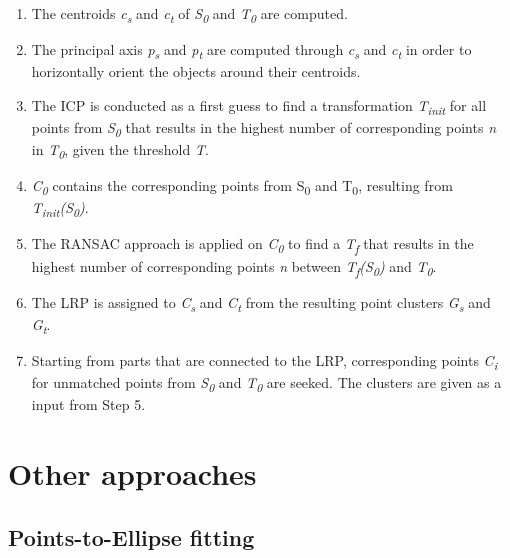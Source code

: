 \begin{enumerate}
	\item The centroids \textit{c\textsubscript{s}} and \textit{c\textsubscript{t}} of \textit{S\textsubscript{0}} and \textit{T\textsubscript{0}} are computed.
	
	\item The principal axis \textit{p\textsubscript{s}} and \textit{p\textsubscript{t}}  are computed through \textit{c\textsubscript{s}} and \textit{c\textsubscript{t}} in order to horizontally orient the objects around their centroids.
	
	\item The ICP is conducted as a first guess to find a transformation \textit{T\textsubscript{init}} for all points from \textit{S\textsubscript{0}} that results in the highest number of corresponding points \textit{n} in \textit{T\textsubscript{0}}, given the threshold \textit{T}.
	
	\item \textit{C\textsubscript{0}} contains the corresponding points from S\textsubscript{0} and T\textsubscript{0}, resulting from \textit{T\textsubscript{init}(S\textsubscript{0})}.
	
	\item The RANSAC approach is applied on \textit{C\textsubscript{0}} to find a  \textit{T\textsubscript{f}} that results in the highest number of corresponding points \textit{n} between \textit{T\textsubscript{f}(S\textsubscript{0})} and \textit{T\textsubscript{0}}.
	
	\item The LRP is assigned to \textit{C\textsubscript{s}} and \textit{C\textsubscript{t}} from the resulting point clusters \textit{G\textsubscript{s}} and \textit{G\textsubscript{t}}.
	
	\item Starting from parts that are connected to the LRP, corresponding points \textit{C\textsubscript{i}} for unmatched points from \textit{S\textsubscript{0}} and \textit{T\textsubscript{0}} are seeked. The clusters are given as a input from Step 5. 
		
\end{enumerate}

\section{Other approaches}

\subsection{Points-to-Ellipse fitting}

